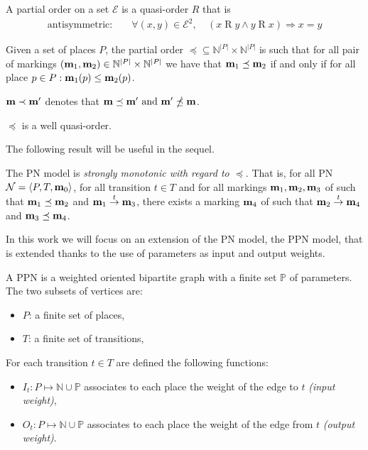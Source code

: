 \begin{defi}
  A partial order on a set $\mathcal{E}$ is a quasi-order $R$ that is
  \begin{align*}
    \text{antisymmetric: } &&\forall (x, y) \in \mathcal{E}^2,\ & (x \mathrel{R} y\land y \mathrel{R} x)\Rightarrow x = y
  \end{align*}
\end{defi}

\begin{defi}
  Given a set of places $P$, the partial order \(\preceq \subseteq \mathbb{N}^{|P|} \times \mathbb{N}^{|P|}\) is such that for all pair of markings \((\mathbf{m}_1, \mathbf{m}_2) \in \mathbb{N}^{|P|} \times \mathbb{N}^{|P|}\) we have that \(\mathbf{m}_1 \preceq \mathbf{m}_2\) if and only if for all place \(p \in P : \mathbf{m}_1(p) \leq \mathbf{m}_2(p)\).
\end{defi}

\(\mathbf{m} \prec \mathbf{m'}\) denotes that \(\mathbf{m} \preceq \mathbf{m'} \text{ and } \mathbf{m'} \npreceq \mathbf{m}\).

\begin{lemm}
  \label{lemm:wqo}
  $\preceq$ is a well quasi-order.
\end{lemm}

The following result will be useful in the sequel.

\begin{lemm}
  The \ac{PN} model is \emph{strongly monotonic with regard to $\preceq$}. That is, for all \ac{PN} $\mathcal{N} = \langle P,T, \mathbf{m}_0\rangle$, for all transition $t \in T$ and for all markings $\mathbf{m}_1, \mathbf{m}_2, \mathbf{m}_3$ of \PN such that $\mathbf{m}_1 \preceq \mathbf{m}_2$ and $\mathbf{m}_1 \stackrel{t}{\to} \mathbf{m}_3$, there exists a marking $\mathbf{m}_4$ of \PN such that $\mathbf{m}_2 \stackrel{t}{\to} \mathbf{m}_4$ and $\mathbf{m}_3 \preceq \mathbf{m}_4$.
\end{lemm}

In this work we will focus on an extension of the \ac{PN} model, the \ac{PPN} model, that is extended thanks to the use of parameters as input and output weights.

\begin{defi}
  A \acf{PPN} \SPTP is a weighted oriented bipartite graph with a finite set $\mathbb{P}$ of parameters. The two subsets of vertices are:
  \begin{itemize}
    \item $P$: a finite set of places,
    \item $T$: a finite set of transitions,
  \end{itemize}
  For each transition $t \in T$ are defined the following functions:
  \begin{itemize}
    \item $I_t : P \mapsto \mathbb{N} \cup \mathbb{P}$ associates to each place the weight of the edge to $t$ \emph{(input weight)},
    \item $O_t : P \mapsto \mathbb{N} \cup \mathbb{P}$ associates to each place the weight of the edge from $t$ \emph{(output weight)}.
  \end{itemize}
\end{defi}


